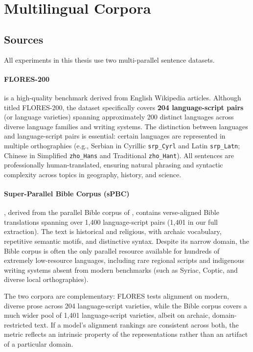 \section{Multilingual Corpora}
\label{sec:parallel-corpora}

\subsection{Sources}
\label{subsec:parallel-sources}

All experiments in this thesis use two multi-parallel sentence datasets.

\paragraph{FLORES-200} \citep{nllbteam2022} is a high-quality benchmark derived from English Wikipedia articles. Although titled FLORES-200, the dataset specifically covers \textbf{204 language-script pairs} (or language varieties) spanning approximately 200 distinct languages across diverse language families and writing systems. The distinction between languages and language-script pairs is essential: certain languages are represented in multiple orthographies (e.g., Serbian in Cyrillic \texttt{srp\_Cyrl} and Latin \texttt{srp\_Latn}; Chinese in Simplified \texttt{zho\_Hans} and Traditional \texttt{zho\_Hant}). All sentences are professionally human-translated, ensuring natural phrasing and syntactic complexity across topics in geography, history, and science.

\paragraph{Super-Parallel Bible Corpus (sPBC)} \citep{kargaran2025mexa}, derived from the parallel Bible corpus of \citet{mayer2014bible}, contains verse-aligned Bible translations spanning over 1,400 language-script pairs (1,401 in our full extraction). The text is historical and religious, with archaic vocabulary, repetitive semantic motifs, and distinctive syntax. Despite its narrow domain, the Bible corpus is often the only parallel resource available for hundreds of extremely low-resource languages, including rare regional scripts and indigenous writing systems absent from modern benchmarks (such as Syriac, Coptic, and diverse local orthographies).

The two corpora are complementary: FLORES tests alignment on modern, diverse prose across 204 language-script varieties, while the Bible corpus covers a much wider pool of 1,401 language-script varieties, albeit on archaic, domain-restricted text. If a model's alignment rankings are consistent across both, the metric reflects an intrinsic property of the representations rather than an artifact of a particular domain.

